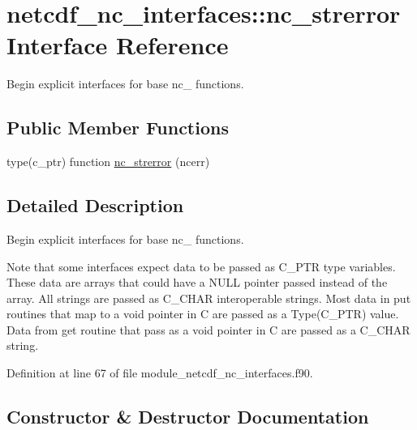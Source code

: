 \hypertarget{interfacenetcdf__nc__interfaces_1_1nc__strerror}{}\section{netcdf\+\_\+nc\+\_\+interfaces\+:\+:nc\+\_\+strerror Interface Reference}
\label{interfacenetcdf__nc__interfaces_1_1nc__strerror}


Begin explicit interfaces for base nc\+\_\+ functions.  


\subsection*{Public Member Functions}
\begin{DoxyCompactItemize}
\item 
type(c\+\_\+ptr) function \hyperlink{interfacenetcdf__nc__interfaces_1_1nc__strerror_aa83b61beca616870a5f3bcf8344bba0f}{nc\+\_\+strerror} (ncerr)
\end{DoxyCompactItemize}


\subsection{Detailed Description}
Begin explicit interfaces for base nc\+\_\+ functions. 

Note that some interfaces expect data to be passed as C\+\_\+\+P\+TR type variables. These data are arrays that could have a N\+U\+LL pointer passed instead of the array. All strings are passed as C\+\_\+\+C\+H\+AR interoperable strings. Most data in put routines that map to a void pointer in C are passed as a Type(\+C\+\_\+\+P\+T\+R) value. Data from get routine that pass as a void pointer in C are passed as a C\+\_\+\+C\+H\+AR string. 

Definition at line 67 of file module\+\_\+netcdf\+\_\+nc\+\_\+interfaces.\+f90.



\subsection{Constructor \& Destructor Documentation}
\mbox{\label{interfacenetcdf__nc__interfaces_1_1nc__strerror_aa83b61beca616870a5f3bcf8344bba0f}} 
